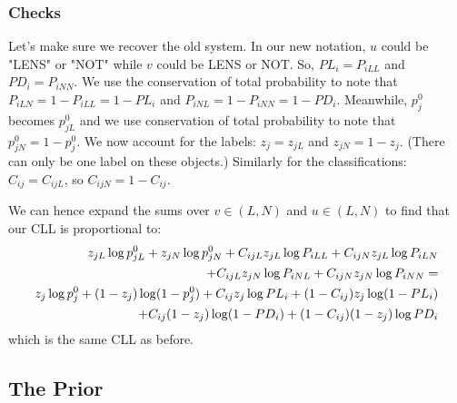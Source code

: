 \documentclass[useAMS,usenatbib,a4paper]{mn2e}
\begin{document}
\subsubsection{Checks}

Let's make sure we recover the old system. In our new notation, $u$ could be
"LENS" or "NOT" while $v$ could be LENS or NOT. So, $PL_i = P_{iLL}$ and $PD_i
= P_{iNN}$. We use the conservation of total probability to note that
$P_{iLN} = 1 - P_{iLL} = 1 - PL_i$ and $P_{iNL} = 1 - P_{iNN} = 1 -
PD_i$. Meanwhile, $p_j^0$ becomes $p_{jL}^0$ and we use conservation of total
probability to note that $p_{jN}^0 = 1 - p_{j}^0$. We now account for the
labels: $z_{j} = z_{jL}$ and $z_{jN} = 1 - z_{j}$. (There can only be one
label on these objects.) Similarly for the classifications: $C_{ij} = C_{ijL}$,
so $C_{ijN} = 1 - C_{ij}$.

We can hence expand the
sums over $v \in (L, N)$ and $u \in (L, N)$ to find that our CLL is
proportional to:
\begin{align}
z_{jL} \log p_{jL}^0 + z_{jN} \log p_{jN}^0 +
C_{ijL} z_{jL} \log P_{iLL} + C_{ijN} z_{jL} \log P_{iLN} \notag\\ + C_{ijL} z_{jN} \log
P_{iNL} + C_{ijN} z_{jN} \log P_{iNN} = \notag\\
z_j \log p_j^0 + (1 - z_j) \log (1 - p_j^0) + C_{ij} z_j \log PL_i + (1 -
C_{ij}) z_j \log (1 - PL_i) \notag\\
+ C_{ij} (1 - z_j) \log (1 - PD_i) + (1 - C_{ij})
(1 - z_j) \log PD_i
\end{align}
which is the same CLL as before.

\subsection{The Prior}


\end{document}
